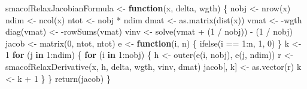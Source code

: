 \documentclass[
  12pt,
  letterpaper,
  DIV=11,
  numbers=noendperiod]{scrartcl}
\newenvironment{Shaded}{\begin{snugshade}}{\end{snugshade}}
\newcommand{\ControlFlowTok}[1]{\textcolor[rgb]{0.00,0.23,0.31}{\textbf{#1}}}
\newcommand{\DecValTok}[1]{\textcolor[rgb]{0.68,0.00,0.00}{#1}}
\newcommand{\FunctionTok}[1]{\textcolor[rgb]{0.28,0.35,0.67}{#1}}
\newcommand{\NormalTok}[1]{\textcolor[rgb]{0.00,0.23,0.31}{#1}}
\newcommand{\OtherTok}[1]{\textcolor[rgb]{0.00,0.23,0.31}{#1}}
\newcommand{\SpecialCharTok}[1]{\textcolor[rgb]{0.37,0.37,0.37}{#1}}
\begin{document}
\begin{Shaded}
\begin{Highlighting}[]
\NormalTok{smacofRelaxJacobianFormula }\OtherTok{\textless{}{-}} \ControlFlowTok{function}\NormalTok{(x, delta, wgth) \{}
\NormalTok{  nobj }\OtherTok{\textless{}{-}} \FunctionTok{nrow}\NormalTok{(x)}
\NormalTok{  ndim }\OtherTok{\textless{}{-}} \FunctionTok{ncol}\NormalTok{(x)}
\NormalTok{  ntot }\OtherTok{\textless{}{-}}\NormalTok{ nobj }\SpecialCharTok{*}\NormalTok{ ndim}
\NormalTok{  dmat }\OtherTok{\textless{}{-}} \FunctionTok{as.matrix}\NormalTok{(}\FunctionTok{dist}\NormalTok{(x))}
\NormalTok{  vmat }\OtherTok{\textless{}{-}} \SpecialCharTok{{-}}\NormalTok{wgth}
  \FunctionTok{diag}\NormalTok{(vmat) }\OtherTok{\textless{}{-}} \SpecialCharTok{{-}}\FunctionTok{rowSums}\NormalTok{(vmat)}
\NormalTok{  vinv }\OtherTok{\textless{}{-}} \FunctionTok{solve}\NormalTok{(vmat }\SpecialCharTok{+}\NormalTok{ (}\DecValTok{1} \SpecialCharTok{/}\NormalTok{ nobj)) }\SpecialCharTok{{-}}\NormalTok{ (}\DecValTok{1} \SpecialCharTok{/}\NormalTok{ nobj)}
\NormalTok{  jacob }\OtherTok{\textless{}{-}} \FunctionTok{matrix}\NormalTok{(}\DecValTok{0}\NormalTok{, ntot, ntot)}
\NormalTok{  e }\OtherTok{\textless{}{-}} \ControlFlowTok{function}\NormalTok{(i, n) \{}
    \FunctionTok{ifelse}\NormalTok{(i }\SpecialCharTok{==} \DecValTok{1}\SpecialCharTok{:}\NormalTok{n, }\DecValTok{1}\NormalTok{, }\DecValTok{0}\NormalTok{)}
\NormalTok{  \}}
\NormalTok{  k }\OtherTok{\textless{}{-}} \DecValTok{1}
  \ControlFlowTok{for}\NormalTok{ (j }\ControlFlowTok{in} \DecValTok{1}\SpecialCharTok{:}\NormalTok{ndim) \{}
    \ControlFlowTok{for}\NormalTok{ (i }\ControlFlowTok{in} \DecValTok{1}\SpecialCharTok{:}\NormalTok{nobj) \{}
\NormalTok{      h }\OtherTok{\textless{}{-}} \FunctionTok{outer}\NormalTok{(}\FunctionTok{e}\NormalTok{(i, nobj), }\FunctionTok{e}\NormalTok{(j, ndim))}
\NormalTok{      r }\OtherTok{\textless{}{-}} \FunctionTok{smacofRelaxDerivative}\NormalTok{(x, h, delta, wgth, vinv, dmat)}
\NormalTok{      jacob[, k] }\OtherTok{\textless{}{-}} \FunctionTok{as.vector}\NormalTok{(r)}
\NormalTok{      k }\OtherTok{\textless{}{-}}\NormalTok{ k }\SpecialCharTok{+} \DecValTok{1}
\NormalTok{    \}}
\NormalTok{  \}}
  \FunctionTok{return}\NormalTok{(jacob)}
\NormalTok{\}}


\end{Highlighting}
\end{Shaded}
\end{document}
